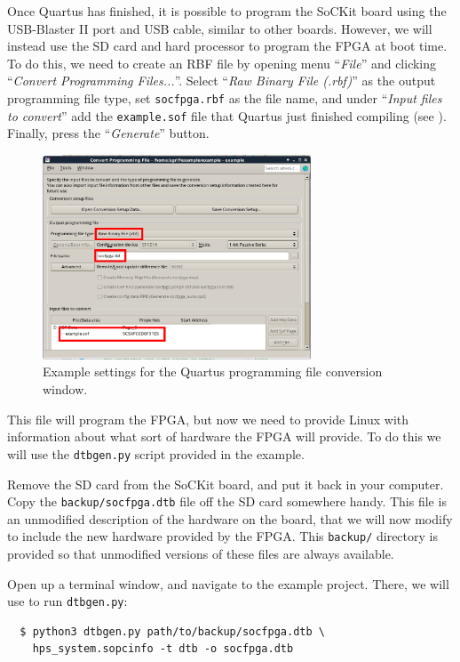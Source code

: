 \documentclass{sockitguide}
\begin{document}
Once Quartus has finished, it is possible to program the SoCKit board
using the USB-Blaster II port and USB cable, similar to other
boards. However, we will instead use the SD card and hard processor to
program the FPGA at boot time. To do this, we need to create an RBF
file by opening menu ``\textit{File}'' and clicking ``\textit{Convert
  Programming Files...}''. Select ``\textit{Raw Binary File (.rbf)}''
as the output programming file type, set \texttt{socfpga.rbf} as the
file name, and under ``\textit{Input files to convert}'' add the
\texttt{example.sof} file that Quartus just finished compiling (see
). Finally, press the ``\textit{Generate}'' button.

\begin{figure}
  \includegraphics[width=8cm]{figures/rbf.png}
  \caption{Example settings for the Quartus programming file conversion window.}
  \label{fig:rbf}
\end{figure}

This file will program the FPGA, but now we need to provide Linux with
information about what sort of hardware the FPGA will provide. To do
this we will use the \texttt{dtbgen.py} script provided in the
example.

Remove the SD card from the SoCKit board, and put it back in your
computer. Copy the \texttt{backup/socfpga.dtb} file off the SD card
somewhere handy. This file is an unmodified description of the
hardware on the board, that we will now modify to include the new
hardware provided by the FPGA. This \texttt{backup/} directory is
provided so that unmodified versions of these files are always
available.

Open up a terminal window, and navigate to the example project. There,
we will use  to run
\texttt{dtbgen.py}:
\begin{verbatim}
  $ python3 dtbgen.py path/to/backup/socfpga.dtb \
    hps_system.sopcinfo -t dtb -o socfpga.dtb
\end{verbatim}
\end{document}
